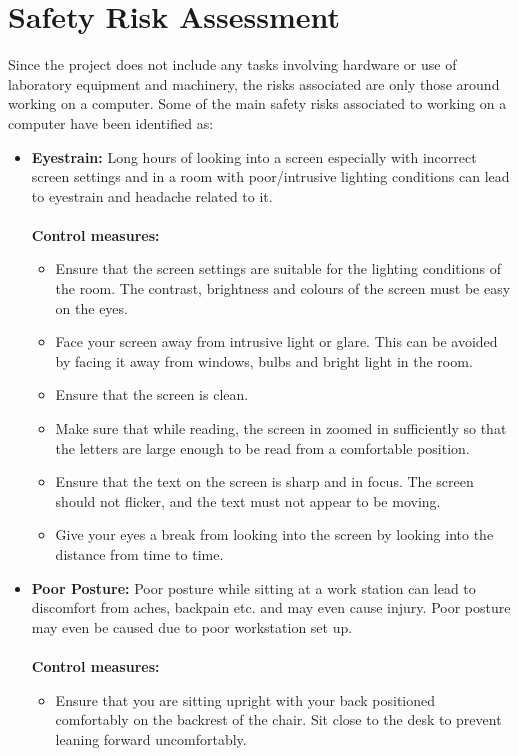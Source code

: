 \documentclass[a4paper,12pt]{report}
\begin{document}
\section{Safety Risk Assessment}
Since the project does not include any tasks involving hardware or use of laboratory equipment and machinery, the risks associated are only those around working on a computer. Some of the main safety risks associated to working on a computer have been identified as:
\begin{itemize}
	\item  	\textbf{Eyestrain:} Long hours of looking into a screen especially with incorrect screen settings and in a room with poor/intrusive lighting conditions can lead to eyestrain and headache related to it. \\ \\
	\textbf{Control measures:}
	\begin{itemize}
		\item Ensure that the screen settings are suitable for the lighting conditions of the room. The contrast, brightness and colours of the screen must be easy on the eyes.
		\item Face your screen away from intrusive light or glare. This can be avoided by facing it away from windows, bulbs and bright light in the room.
		\item Ensure that the screen is clean.
		\item Make sure that while reading, the screen in zoomed in sufficiently so that the letters are large enough to be read from a comfortable position.
		\item Ensure that the text on the screen is sharp and in focus. The screen should not flicker, and the text must not appear to be moving.
		\item Give your eyes a break from looking into the screen by looking into the distance from time to time.
	\end{itemize}
	\item \textbf{Poor Posture:} Poor posture while sitting at a work station can lead to discomfort from aches, backpain etc. and may even cause injury. Poor posture may even be caused due to poor workstation set up.\\ \\
	\textbf{Control measures:}
	\begin{itemize}
		\item Ensure that you are sitting upright with your back positioned comfortably on the backrest of the chair. Sit close to the desk to prevent leaning forward uncomfortably.

\end{itemize}
\end{itemize}
\end{document}
